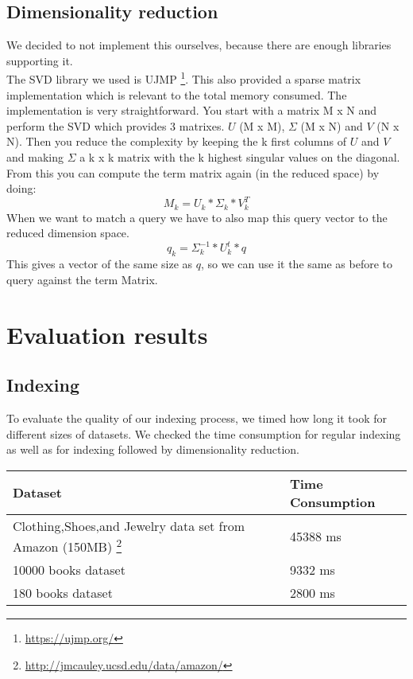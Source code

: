 \documentclass[10pt,a4paper]{paper}
\begin{document}
\subsection{Dimensionality reduction}

We decided to not implement this ourselves, because there are enough libraries supporting it.\\
The SVD library we used is UJMP \footnote{\url{https://ujmp.org/}}. This also provided a sparse matrix implementation which is relevant to the total memory consumed. The implementation is very straightforward. You start with a matrix M x N and perform the SVD which provides 3 matrixes. $U$ (M x M), $\Sigma$ (M x N) and $V$ (N x N). Then you reduce the complexity by keeping the k first columns of $U$ and $V$ and making $\Sigma$ a k x k matrix with the k highest singular values on the diagonal. From this you can compute the term matrix again (in the reduced space) by doing:
\[
M_k = U_k * \Sigma_k * V_k^T
\]
When we want to match a query we have to also map this query vector to the reduced dimension space.
\[
q_k = \Sigma_k^{-1} * U_k^t * q
\]
This gives a vector of the same size as $q$, so we can use it the same as before to query against the term Matrix.

\section{Evaluation results}

\subsection{Indexing}

To evaluate the quality of our indexing process, we timed how long it took for different sizes of datasets. We checked the time consumption for regular indexing as well as for indexing followed by dimensionality reduction. %

\begin{tabular} {l|l}
Dataset & Time Consumption \\ \hline
Clothing,Shoes,and Jewelry data set from Amazon (150MB) \footnote{\url{http://jmcauley.ucsd.edu/data/amazon/}} &  45388 ms \\ \hline
10000 books dataset & 9332 ms \\ \hline

180 books dataset & 2800 ms \\ \hline


\end{tabular}
\end{document}
